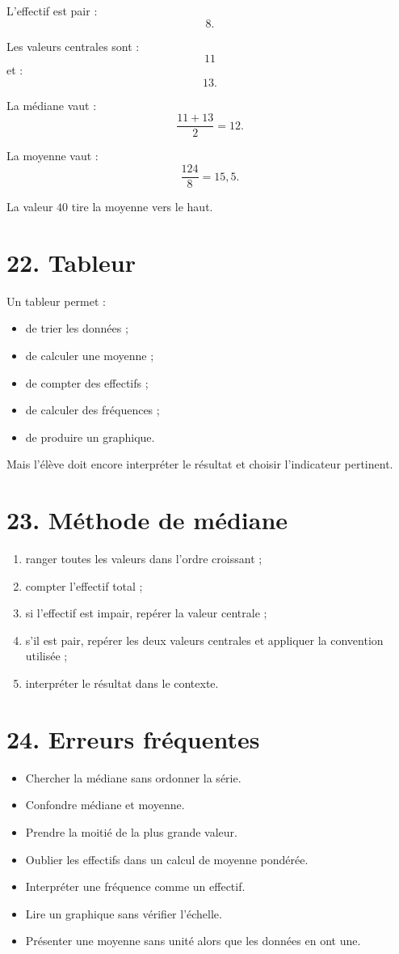 L'effectif est pair :
\[
8.
\]

Les valeurs centrales sont :
\[
11
\]
et :
\[
13.
\]

La médiane vaut :
\[
\dfrac{11+13}{2}=12.
\]

La moyenne vaut :
\[
\dfrac{124}{8}=15{,}5.
\]

La valeur $40$ tire la moyenne vers le haut.

\section{22. Tableur}

Un tableur permet :
\begin{itemize}
\item de trier les données ;
\item de calculer une moyenne ;
\item de compter des effectifs ;
\item de calculer des fréquences ;
\item de produire un graphique.
\end{itemize}

Mais l'élève doit encore interpréter le résultat et choisir l'indicateur pertinent.

\section{23. Méthode de médiane}

\begin{methode}
\begin{enumerate}
\item ranger toutes les valeurs dans l'ordre croissant ;
\item compter l'effectif total ;
\item si l'effectif est impair, repérer la valeur centrale ;
\item s'il est pair, repérer les deux valeurs centrales et appliquer la convention utilisée ;
\item interpréter le résultat dans le contexte.
\end{enumerate}
\end{methode}

\section{24. Erreurs fréquentes}

\begin{itemize}
\item Chercher la médiane sans ordonner la série.
\item Confondre médiane et moyenne.
\item Prendre la moitié de la plus grande valeur.
\item Oublier les effectifs dans un calcul de moyenne pondérée.
\item Interpréter une fréquence comme un effectif.
\item Lire un graphique sans vérifier l'échelle.
\item Présenter une moyenne sans unité alors que les données en ont une.
\end{itemize}


